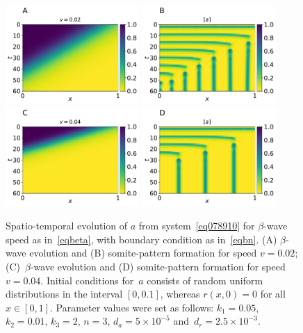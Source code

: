 \documentclass[11pt]{article}
\begin{document}
	\begin{figure}[t!]
		\centering
		\includegraphics[width=2in]{Figures/Fig04aRev.pdf}
		\includegraphics[width=2in]{Figures/Fig04bRev.pdf} \\
		\includegraphics[width=2in]{Figures/Fig04cRev.pdf}
		\includegraphics[width=2in]{Figures/Fig04dRev.pdf}
		\caption{Spatio-temporal evolution of $a$ from system~\eqref{eq078910} for
			$\beta$-wave speed as in~\eqref{eqbeta}, with boundary condition as
			in~\eqref{eqbn}. (A) $\beta$-wave evolution and (B) somite-pattern formation for
			speed $v=0.02$; (C)~$\beta$-wave evolution and (D) somite-pattern formation for
			speed  $v=0.04$. Initial conditions for~$a$ consists of random uniform
			distributions in the interval $[0, 0.1]$, whereas $r(x, 0) = 0$ for all
			$x\in[0,1]$. Parameter values were set as follows: $k_1=0.05$, $k_2=0.01$, $k_3=2$,
			$n=3$, $d_a = 5\times10^{-5}$ and~$d_r=2.5\times10^{-3}$.}
		\label{Fig04}
	\end{figure}
	
\end{document}
